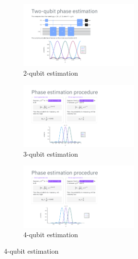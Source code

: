 \documentclass[msc,oneside]{ubcthesis}
\begin{document}
\begin{figure}[ht]
	\centering
	\begin{subfigure}[b]{\linewidth}
		\centering
		\includegraphics[height=3.4cm, trim={2.9cm 0.4cm 6.9cm 5.2cm}, clip]{phase-lecture/18_Phase-estimation-lecture-slides}
		\caption{2-qubit estimation}
		\label{fig:image1}
	\end{subfigure}
	
	\vspace{1ex} %
	
	\begin{subfigure}[b]{\linewidth}
		\centering
		\includegraphics[height=3.4cm, trim={2.9cm 0.15cm 6.9cm 5.95cm}, clip]{phase-lecture/27_Phase-estimation-lecture-slides}
		\caption{3-qubit estimation}
		\label{fig:image2}
	\end{subfigure}
	
	\vspace{1ex} %
	
	\begin{subfigure}[b]{\linewidth}
		\centering
		\includegraphics[height=3.4cm, trim={2.4cm 0.15cm 6.4cm 5.95cm}, clip]{phase-lecture/28_Phase-estimation-lecture-slides}
		\caption{4-qubit estimation}
		\label{fig:image3}
	\end{subfigure}
	

\end{figure}
\end{document}
